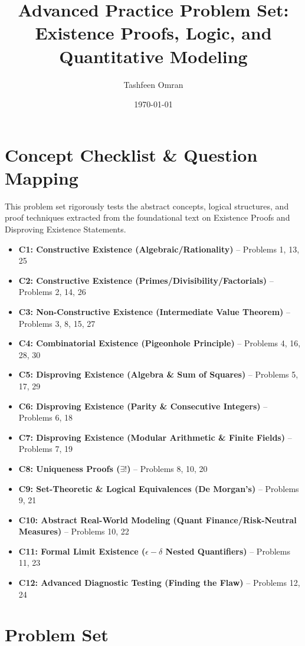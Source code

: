 \documentclass[11pt]{article}
\title{\textbf{Advanced Practice Problem Set: Existence Proofs, Logic, and Quantitative Modeling}}
\author{Tashfeen Omran}
\date{\today}
\begin{document}
\maketitle

\tableofcontents
\clearpage

\section{Concept Checklist \& Question Mapping}
\label{sec:checklist_start}
This problem set rigorously tests the abstract concepts, logical structures, and proof techniques extracted from the foundational text on Existence Proofs and Disproving Existence Statements. 

\begin{itemize}
    \item \textbf{C1: Constructive Existence (Algebraic/Rationality)} -- Problems 1, 13, 25
    \item \textbf{C2: Constructive Existence (Primes/Divisibility/Factorials)} -- Problems 2, 14, 26
    \item \textbf{C3: Non-Constructive Existence (Intermediate Value Theorem)} -- Problems 3, 8, 15, 27
    \item \textbf{C4: Combinatorial Existence (Pigeonhole Principle)} -- Problems 4, 16, 28, 30
    \item \textbf{C5: Disproving Existence (Algebra \& Sum of Squares)} -- Problems 5, 17, 29
    \item \textbf{C6: Disproving Existence (Parity \& Consecutive Integers)} -- Problems 6, 18
    \item \textbf{C7: Disproving Existence (Modular Arithmetic \& Finite Fields)} -- Problems 7, 19
    \item \textbf{C8: Uniqueness Proofs ($\exists!$)} -- Problems 8, 10, 20
    \item \textbf{C9: Set-Theoretic \& Logical Equivalences (De Morgan's)} -- Problems 9, 21
    \item \textbf{C10: Abstract Real-World Modeling (Quant Finance/Risk-Neutral Measures)} -- Problems 10, 22
    \item \textbf{C11: Formal Limit Existence ($\epsilon-\delta$ Nested Quantifiers)} -- Problems 11, 23
    \item \textbf{C12: Advanced Diagnostic Testing (Finding the Flaw)} -- Problems 12, 24
\end{itemize}

\clearpage

\section{Problem Set}
\end{document}
